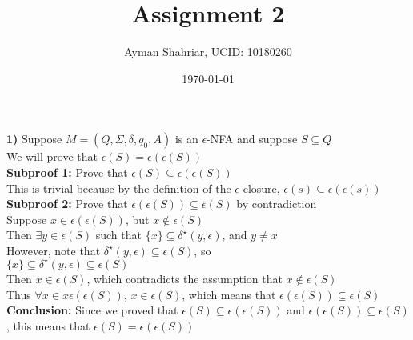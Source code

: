 \documentclass{article}
\title{Assignment 2}
\author{Ayman Shahriar, UCID: 10180260}
\date{\today}
\begin{document}
\maketitle

\textbf{1)} Suppose $M = (Q, \Sigma, \delta, q_0, A)$ is an $\epsilon$-NFA and suppose $S \subseteq Q$ \\
We will prove that $\epsilon(S) = \epsilon(\epsilon(S))$ \\
\textbf{Subproof 1:} Prove that $\epsilon(S) \subseteq \epsilon(\epsilon(S))$\\
This is trivial because by the definition of the $\epsilon$-closure, $\epsilon(s) \subseteq \epsilon(\epsilon(s))$\\
\textbf{Subproof 2:} Prove that $\epsilon(\epsilon(S)) \subseteq \epsilon(S)$ by contradiction\\
Suppose $x \in \epsilon(\epsilon(S))$, but $x \notin \epsilon(S)$\\
Then $\exists y \in \epsilon(S)$ such that $\{x\} \subseteq \delta^\star(y, \epsilon)$, and $y \neq x$\\
However, note that $\delta^\star(y, \epsilon) \subseteq \epsilon(S)$, so \\
$\{x\} \subseteq \delta^\star(y, \epsilon) \subseteq \epsilon(S)$\\
Then $x \in \epsilon(S)$, which contradicts the assumption that $x \notin \epsilon(S)$\\
Thus $\forall x \in x \epsilon(\epsilon(S))$, $x \in \epsilon(S)$, which means that $\epsilon(\epsilon(S)) \subseteq \epsilon(S)$\\
\textbf{Conclusion:} Since we proved that $\epsilon(S) \subseteq \epsilon(\epsilon(S))$ and $\epsilon(\epsilon(S)) \subseteq \epsilon(S)$ , this means that $\epsilon(S) = \epsilon(\epsilon(S))$\\ 
\end{document}
